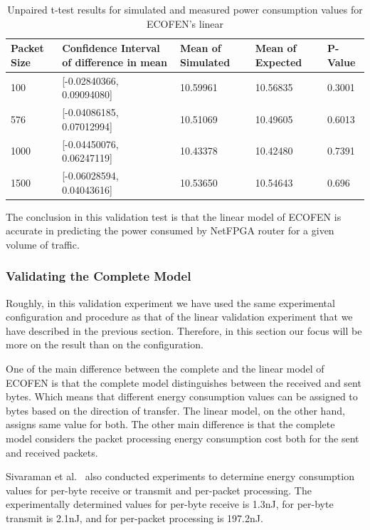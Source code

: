\begin{table}
	\begin{tabular}{|p{1.3cm}|p{4.6cm}|p{2.1cm}|p{2.1cm}|p{1.3cm}|} 
	    \hline 
		\textbf{Packet Size} & \textbf{Confidence Interval of difference in mean} & \textbf{Mean of Simulated} & \textbf{Mean of Expected}& \textbf{P-Value}\\ 
		\hline 
		 100 &	[-0.02840366, 0.09094080]&	10.59961&	10.56835&	0.3001\\
		\hline
		 576 &	[-0.04086185, 0.07012994]&	10.51069&	10.49605&	0.6013\\ 
		\hline
		 1000&	[-0.04450076, 0.06247119]&	10.43378&	10.42480&	0.7391\\ 
	    \hline	 
	     1500&	[-0.06028594, 0.04043616]&	10.53650&	10.54643&	0.696\\ 
	    \hline
	\end{tabular} 
	\caption{Unpaired t-test results for simulated and measured power consumption values for ECOFEN's linear}
	\label{table:linearttest}
\end{table}

The conclusion in this validation test is that the linear model of ECOFEN is accurate in predicting the power consumed by NetFPGA router for a given volume of traffic. 
\subsubsection{Validating the Complete Model}
Roughly, in this validation experiment we have used the same experimental configuration and procedure as that of the linear validation experiment that we have described in the previous section. Therefore, in this section our focus will be more on the result than on the configuration.

One of the main difference between the complete and the linear model of ECOFEN is that the complete model distinguishes between the received and sent bytes. Which means that different energy consumption values can be assigned to bytes based on the direction of transfer. The linear model, on the other hand, assigns same value for both. The other main difference is that the complete model considers the packet processing energy consumption cost both for the sent and received packets. 

Sivaraman et al.{\ }\cite{Sivaraman} also conducted experiments to determine energy consumption values for per-byte receive or transmit and per-packet processing. The experimentally determined values for per-byte receive is 1.3nJ, for per-byte transmit is 2.1nJ, and for per-packet processing is 197.2nJ. 

